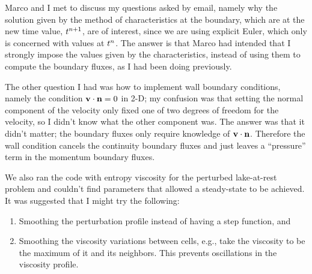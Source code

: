 Marco and I met to discuss my questions asked by email, namely why the
solution given by the method of characteristics at the boundary, which
are at the new time value, $t^{n+1}$, are of interest,
since we are using explicit Euler, which only is concerned with values
at $t^{n}$. The answer is that Marco had intended that
I strongly impose the values given by the characteristics, instead of
using them to compute the boundary fluxes, as I had been doing previously.

The other question I had was how to implement wall boundary conditions,
namely the condition $\mathbf{v}\cdot\mathbf{n}=0$ in 2-D; my confusion
was that setting the normal component of the velocity only fixed one of
two degrees of freedom for the velocity, so I didn't know what the other
component was. The answer was that it didn't matter; the boundary fluxes
only require knowledge of $\mathbf{v}\cdot\mathbf{n}$. Therefore the
wall condition cancels the continuity boundary fluxes and just leaves
a ``pressure'' term in the momentum boundary fluxes.

We also ran the code with entropy viscosity for the perturbed lake-at-rest
problem and couldn't find parameters that allowed a steady-state
to be achieved. It was suggested that I might try the following:
\begin{enumerate}
  \item Smoothing the perturbation profile instead of having a step function, and
  \item Smoothing the viscosity variations between cells, e.g., take the viscosity
    to be the maximum of it and its neighbors. This prevents oscillations in the
    viscosity profile.
\end{enumerate}

